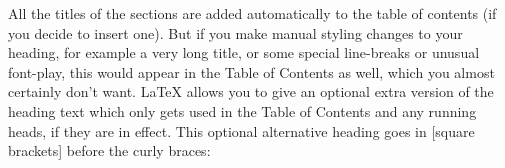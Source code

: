 
All the titles of the sections are added automatically to the table of contents (if you decide to insert one). But if you make manual styling changes to your heading, for example a very long title, or some special line-breaks or unusual font-play, this would appear in the Table of Contents as well, which you almost certainly don't want. LaTeX allows you to give an optional extra version of the heading text which only gets used in the Table of Contents and any running heads, if they are in effect. This optional alternative heading goes in [square brackets] before the curly braces:

